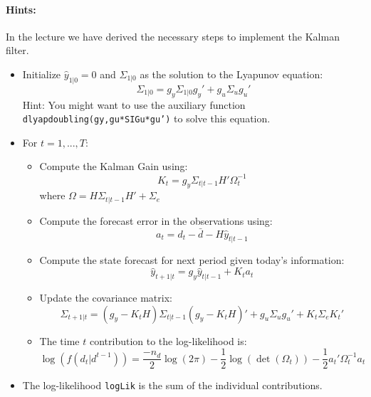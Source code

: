\documentclass{article}
\begin{document}
\paragraph{Hints:}
In the lecture we have derived the necessary steps to implement the Kalman filter.
\begin{itemize}
\item Initialize $\hat{y}_{1|0}=0$ and $\Sigma_{1|0}$ as the solution to the Lyapunov equation:
$$\Sigma_{1|0} = g_y \Sigma_{1|0} g_y' + g_u \Sigma_u g_u'$$
Hint: You might want to use the auxiliary function \texttt{dlyapdoubling(gy,gu*SIGu*gu')} to solve this equation.
\item For $t=1,...,T$:
\begin{itemize}
	\item Compute the Kalman Gain using: $$K_t = g_y \Sigma_{t|t-1} H' \Omega_t^{-1}$$ where $\Omega=H \Sigma_{t|t-1} H' + \Sigma_e$		
	\item Compute the forecast error in the observations using: $$a_t=d_t - \bar{d} - H \hat{y}_{t|t-1}$$		
	\item Compute the state forecast for next period given today's information: $$\hat{y}_{t+1|t} = g_y \hat{y}_{t|t-1} + K_t a_t$$
	\item Update the covariance matrix: $$\Sigma_{t+1|t} = (g_y - K_t H) \Sigma_{t|t-1} (g_y - K_t H)' + g_u \Sigma_u g_u' + K_t \Sigma_e K_t'$$
	\item The time \(t\) contribution to the log-likelihood is:
	$$\log(f(d_t|d^{t-1})) = \frac{-n_d}{2}\log(2\pi) -\frac{1}{2}\log(\det(\Omega_t)) - \frac{1}{2} a_t' \Omega_t^{-1} a_t$$
\end{itemize}
\item The log-likelihood \texttt{logLik} is the sum of the individual contributions.
\end{itemize}



\newpage
\end{document}
